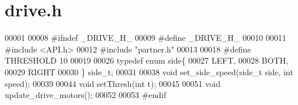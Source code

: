 \section{drive.\+h}
\label{drive_8h_source}

\begin{DoxyCode}
00001 
00008 \textcolor{preprocessor}{#ifndef \_DRIVE\_H\_}
00009 \textcolor{preprocessor}{#define \_DRIVE\_H\_}
00010 
00011 \textcolor{preprocessor}{#include <API.h>}
00012 \textcolor{preprocessor}{#include "partner.h"}
00013 
00018 \textcolor{preprocessor}{#define THRESHOLD 10}
00019 
00026 \textcolor{keyword}{typedef} \textcolor{keyword}{enum} side\{
00027   LEFT,
00028   BOTH,
00029   RIGHT
00030 \} side_t;
00031 
00038 \textcolor{keywordtype}{void} set_side_speed(side_t side, \textcolor{keywordtype}{int} speed);
00039 
00044 \textcolor{keywordtype}{void} setThresh(\textcolor{keywordtype}{int} t);
00045 
00051 \textcolor{keywordtype}{void} update_drive_motors();
00052 
00053 \textcolor{preprocessor}{#endif}
\end{DoxyCode}

